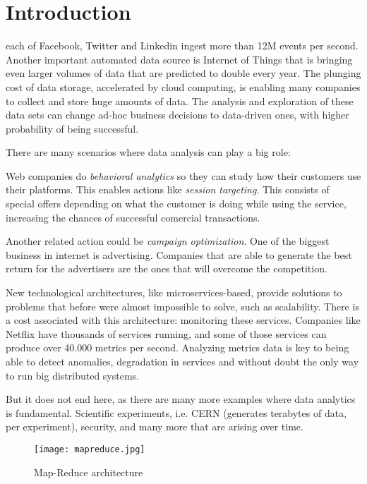 \chapter{Introduction}
\label{chap:introduction}

 each of Facebook, Twitter and Linkedin \cite{facebook, twitter, linkedin}
ingest more than 12M events per second. Another important automated data source
is Internet of Things \cite{iot} that is bringing even larger volumes of data
that are predicted to double every year. The plunging cost of data storage,
accelerated by cloud computing, is enabling many companies to collect and store
huge amounts of data. The analysis and exploration of these data sets can change
ad-hoc business decisions to data-driven ones, with higher probability of being
successful.

\bigskip

There are many scenarios where data analysis can play a big role:

Web companies do \textit{behavioral analytics} so they can study how their customers use
their platforms. This enables actions like \textit{session targeting}. This consists of
special offers depending on what the customer is doing while using the service,
increasing the chances of successful comercial transactions.

Another related action could be \textit{campaign optimization}. One of the biggest
business in internet is advertising. Companies that are able to generate the best
return for the advertisers are the ones that will overcome the competition.

New technological architectures, like microservices-based, provide solutions to
problems that before were almost impossible to solve, such as scalability. There is
a cost associated with this architecture: monitoring these services. Companies
like Netflix have thousands of services running\cite{netflix}, and some of those
services can produce over 40.000 metrics per second. Analyzing metrics data is
key to being able to detect anomalies, degradation in services and without doubt
the only way to run big distributed systems.

But it does not end here, as there are many more examples where data analytics
is fundamental. Scientific experiments, i.e. CERN (generates terabytes of data, per
experiment)\cite{cern}, security, and many more that are arising over time.

\bigskip

\begin{figure}[!h]
\begin{center}
\texttt{[image: mapreduce.jpg]}
\caption{Map-Reduce architecture\cite{mapreduce}}
\label{fig:mapreduce}
\end{center}
\end{figure}


